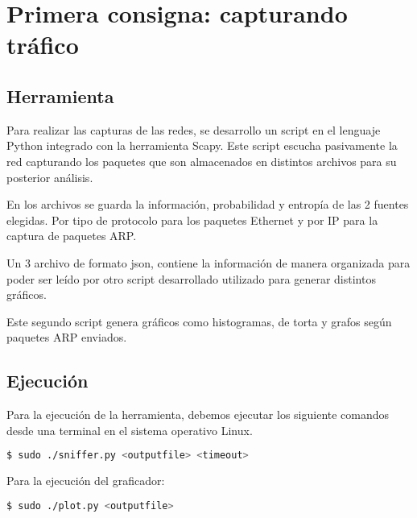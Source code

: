 \section{Primera consigna: capturando tráfico}

\subsection{Herramienta}

Para realizar las capturas de las redes, se desarrollo un script en el lenguaje Python integrado con la herramienta Scapy.
Este script escucha pasivamente la red capturando los paquetes que son almacenados en distintos archivos para su posterior análisis.

En los archivos se guarda la información, probabilidad y entropía de las 2 fuentes elegidas. Por tipo de protocolo para los paquetes Ethernet y por IP para la captura de paquetes ARP.

Un 3 archivo de formato json, contiene la información de manera organizada para poder ser leído por otro script desarrollado utilizado para generar distintos gráficos.

Este segundo script genera gráficos como histogramas, de torta y grafos según paquetes ARP enviados.

\subsection{Ejecución}

Para la ejecución de la herramienta, debemos ejecutar los siguiente comandos desde una terminal en el sistema operativo Linux.

\begin{lstlisting}[language=bash]
  $ sudo ./sniffer.py <outputfile> <timeout> 
\end{lstlisting}

Para la ejecución del graficador:

\begin{lstlisting}[language=bash]
  $ sudo ./plot.py <outputfile> 
\end{lstlisting}
